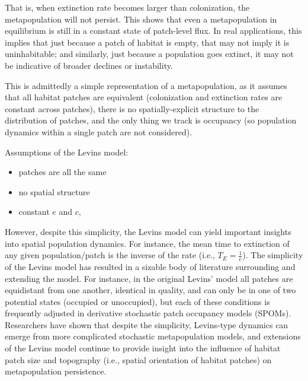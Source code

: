 \documentclass[12pt]{article}
\begin{document}
That is, when extinction rate becomes larger than colonization, the metapopulation will not persist. This shows that even a metapopulation in equilibrium is still in a constant state of patch-level flux. In real applications, this implies that just because a patch of habitat is empty, that may not imply it is uninhabitable; and similarly, just because a population goes extinct, it may not be indicative of broader declines or instability.


This is admittedly a simple representation of a metapopulation, as it assumes that all habitat patches are equivalent (colonization and extinction rates are constant across patches), there is no spatially-explicit structure to the distribution of patches, and the only thing we track is occupancy (so population dynamics within a single patch are not considered). 




Assumptions of the Levins model:
\begin{itemize}
  \item patches are all the same
  \item no spatial structure 
  \item constant $e$ and $c$, 

\end{itemize} 


However, despite this simplicity, the Levins model can yield important insights into spatial population dynamics. For instance, the mean time to extinction of any given population/patch is the inverse of the rate (i.e., $T_E = \frac{1}{e}$). The simplicity of the Levins model has resulted in a sizable body of literature surrounding and extending the model. For instance, in the original Levins' model all patches are equidistant from one another, identical in quality, and can only be in one of two potential states (occupied or unoccupied), but each of these conditions is frequently adjusted in derivative stochastic patch occupancy models (SPOMs). Researchers have shown that despite the simplicity, Levins-type dynamics can emerge from more complicated stochastic metapopulation models, and extensions of the Levins model continue to provide insight into the influence of habitat patch size and topography (i.e., spatial orientation of habitat patches) on metapopulation persistence.
\end{document}
